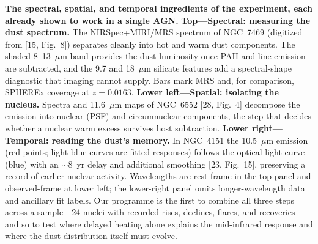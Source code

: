 \caption{\textbf{The spectral, spatial, and temporal ingredients of the experiment, each already shown to work in a single AGN.}
\textbf{Top---Spectral: measuring the dust spectrum.} The NIRSpec+MIRI/MRS spectrum of
NGC~7469 (digitized from [15, Fig.~8]) separates cleanly into hot and warm dust
components. The shaded 8--13~$\mu$m band provides the dust luminosity once PAH
and line emission are subtracted, and the 9.7 and 18~$\mu$m silicate features
add a spectral-shape diagnostic that imaging cannot supply. Bars mark MRS and,
for comparison, SPHEREx coverage at $z=0.0163$.
\textbf{Lower left---Spatial: isolating the nucleus.} Spectra and 11.6~$\mu$m maps of
NGC~6552 [28, Fig.~4] decompose the emission into nuclear (PSF) and
circumnuclear components, the step that decides whether a nuclear warm excess
survives host subtraction.
\textbf{Lower right---Temporal: reading the dust's memory.} In NGC~4151 the 10.5~$\mu$m
emission (red points; light-blue curves are fitted responses) follows the
optical light curve (blue) with an $\sim$8~yr delay and additional smoothing
[23, Fig.~15], preserving a record of earlier nuclear activity.
Wavelengths are rest-frame in the top panel and observed-frame at lower left;
the lower-right panel omits longer-wavelength data and ancillary fit labels.
Our programme is the first to combine all three steps across a sample---24 nuclei
with recorded rises, declines, flares, and recoveries---and so to test where
delayed heating alone explains the mid-infrared response and where the dust
distribution itself must evolve.}
